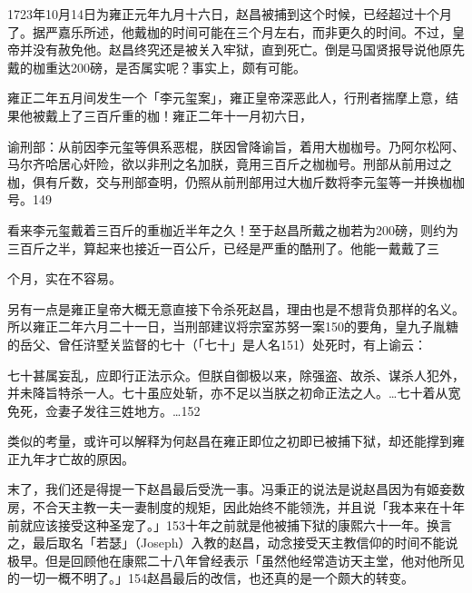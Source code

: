1723年10月14日为雍正元年九月十六日，赵昌被捕到这个时候，已经超过十个月了。据严嘉乐所述，他戴枷的时间可能在三个月左右，而非更久的时间。不过，皇帝并没有赦免他。赵昌终究还是被关入牢狱，直到死亡。倒是马国贤报导说他原先戴的枷重达200磅，是否属实呢？事实上，颇有可能。

雍正二年五月间发生一个「李元玺案」，雍正皇帝深恶此人，行刑者揣摩上意，结果他被戴上了三百斤重的枷！雍正二年十一月初六日，

\begin{BookQuote}
谕刑部：从前因李元玺等俱系恶棍，朕因曾降谕旨，着用大枷枷号。乃阿尔松阿、马尔齐哈居心奸险，欲以非刑之名加朕，竟用三百斤之枷枷号。刑部从前用过之枷，俱有斤数，交与刑部查明，仍照从前刑部用过大枷斤数将李元玺等一并换枷枷号。149
\end{BookQuote}

看来李元玺戴着三百斤的重枷近半年之久！至于赵昌所戴之枷若为200磅，则约为三百斤之半，算起来也接近一百公斤，已经是严重的酷刑了。他能一戴戴了三

\vfill
\begin{BookNotes}
\end{BookNotes}

\noindent 个月，实在不容易。

另有一点是雍正皇帝大概无意直接下令杀死赵昌，理由也是不想背负那样的名义。所以雍正二年六月二十一日，当刑部建议将宗室苏努一案150的要角，皇九子胤糖的岳父、曾任浒墅关监督的七十（「七十」是人名151）处死时，有上谕云：

\begin{BookQuote}
七十甚属妄乱，应即行正法示众。但朕自御极以来，除强盗、故杀、谋杀人犯外，并未降旨特杀一人。七十虽应处斩，亦不足以当朕之初命正法之人。…七十着从宽免死，佥妻子发往三姓地方。…152
\end{BookQuote}

类似的考量，或许可以解释为何赵昌在雍正即位之初即已被捕下狱，却还能撑到雍正九年才亡故的原因。

末了，我们还是得提一下赵昌最后受洗一事。冯秉正的说法是说赵昌因为有姬妾数房，不合天主教一夫一妻制度的规矩，因此始终不能领洗，并且说「我本来在十年前就应该接受这种圣宠了。」153十年之前就是他被捕下狱的康熙六十一年。换言之，最后取名「若瑟」（Joseph）入教的赵昌，动念接受天主教信仰的时间不能说极早。但是回顾他在康熙二十八年曾经表示「虽然他经常造访天主堂，他对他所见的一切一概不明了。」154赵昌最后的改信，也还真的是一个颇大的转变。

